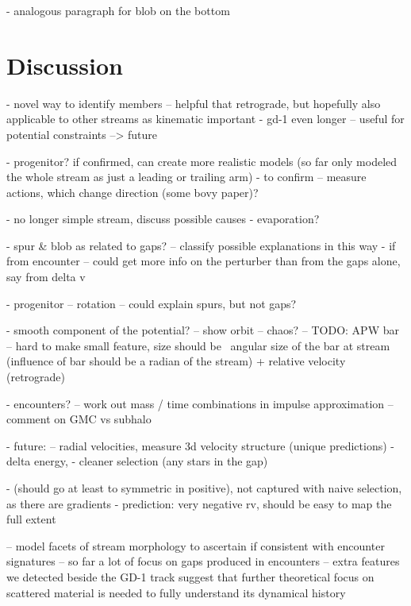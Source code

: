 \documentclass[modern]{aastex62}
\newcommand{\todo}[1]{{\color{red} TODO: #1}}
\begin{document}
- analogous paragraph for blob on the bottom



\section{Discussion}
\label{sec:discussion}

- novel way to identify members -- helpful that retrograde, but hopefully also applicable to other streams as kinematic important
- gd-1 even longer -- useful for potential constraints --> future

- progenitor? if confirmed, can create more realistic models (so far only modeled the whole stream as just a leading or trailing arm)
- to confirm -- measure actions, which change direction (some bovy paper)?

- no longer simple stream, discuss possible causes
- evaporation?

- spur \& blob as related to gaps? -- classify possible explanations in this way
- if from encounter -- could get more info on the perturber than from the gaps alone, say from delta v

- progenitor
-- rotation -- could explain spurs, but not gaps?

- smooth component of the potential?
-- show orbit
-- chaos?
-- \todo{APW} bar -- hard to make small feature, size should be ~angular size of the bar at stream (influence of bar should be a radian of the stream) + relative velocity (retrograde)

- encounters?
-- work out mass / time combinations in impulse approximation
-- comment on GMC vs subhalo

- future:
-- radial velocities, measure 3d velocity structure (unique predictions)
- delta energy, 
- cleaner selection (any stars in the gap)

- (should go at least to symmetric in positive), not captured with naive selection, as there are gradients
- prediction: very negative rv, should be easy to map the full extent 

-- model facets of stream morphology to ascertain if consistent with encounter signatures
-- so far a lot of focus on gaps produced in encounters -- extra features we detected beside the GD-1 track suggest that further theoretical focus on scattered material is needed to fully understand its dynamical history
\end{document}
